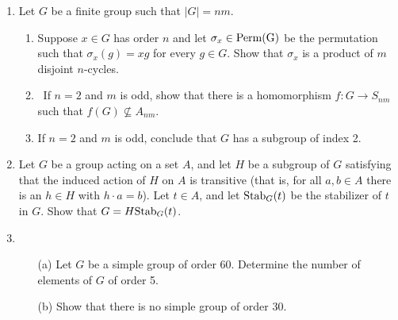 \documentclass[12pt]{article}
\theoremstyle{theorem}
\theoremstyle{definition}
\begin{document}
\begin{enumerate}


\item 
Let $G$ be a finite group  such that $|G|=nm$. 
\begin{enumerate}
\item Suppose $x \in G$ has order $n$ and let $\sigma_x \in \rm{Perm}(G)$ be the permutation such that $\sigma_x(g) = xg$ for every $g \in G$. Show that $\sigma_x$ is a product of $m$ disjoint $n$-cycles. \item If $n = 2$ and $m$ is odd, show that there is a homomorphism $f : G \to S_{nm}$ such that $f(G)\not\subseteq A_{nm}$. 
\item If $n = 2$ and $m$ is odd, conclude that $G$ has a subgroup of index 2.
\end{enumerate}

\medskip


\item Let $G$ be a group acting on a set $A$, and
let $H$ be a subgroup of $G$ satisfying that the induced
action of $H$ on $A$ is transitive (that is, for all
$a,b \in A$ there is an $h \in H$ with $h \cdot a = b$).
Let $t \in A$, and let ${\rm Stab}_G(t)$ be the stabilizer of $t$ in $G$.
Show that $G = H {\rm Stab}_G(t)$.


\medskip

\item
\begin{itemize}
\item[(a)] Let $G$ be a simple group of order 60.
Determine the number of elements of $G$ of order 5.
\item[(b)] Show that there is no simple group of order 30.
\end{itemize}




\end{enumerate}
\end{document}
